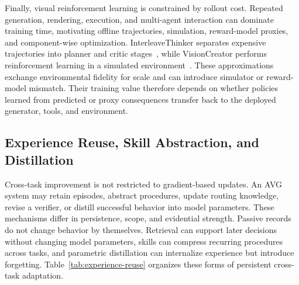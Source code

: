 Finally, visual reinforcement learning is constrained by rollout cost. Repeated generation, rendering, execution, and multi-agent interaction can dominate training time, motivating offline trajectories, simulation, reward-model proxies, and component-wise optimization. InterleaveThinker separates expensive trajectories into planner and critic stages~\cite{avg260613679}, while VisionCreator performs reinforcement learning in a simulated environment~\cite{avg260302681}. These approximations exchange environmental fidelity for scale and can introduce simulator or reward-model mismatch. Their training value therefore depends on whether policies learned from predicted or proxy consequences transfer back to the deployed generator, tools, and environment.

\subsection{Experience Reuse, Skill Abstraction, and Distillation}
\label{subsec:experience-distillation}

Cross-task improvement is not restricted to gradient-based updates. An AVG system may retain episodes, abstract procedures, update routing knowledge, revise a verifier, or distill successful behavior into model parameters. These mechanisms differ in persistence, scope, and evidential strength. Passive records do not change behavior by themselves. Retrieval can support later decisions without changing model parameters, skills can compress recurring procedures across tasks, and parametric distillation can internalize experience but introduce forgetting. Table~\ref{tab:experience-reuse} organizes these forms of persistent cross-task adaptation.

